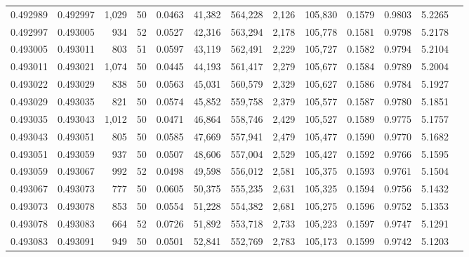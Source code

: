 \begin{tabular}{rrrrrrrrrrrrr}
0.492989 & 0.492997 & 1,029 &  50 &                                     0.0463 &  41,382 & 564,228 &   2,126 & 105,830 & 0.1579 & 0.9803 & 5.2265 \\
0.492997 & 0.493005 &   934 &  52 &                                     0.0527 &  42,316 & 563,294 &   2,178 & 105,778 & 0.1581 & 0.9798 & 5.2178 \\
0.493005 & 0.493011 &   803 &  51 &                                     0.0597 &  43,119 & 562,491 &   2,229 & 105,727 & 0.1582 & 0.9794 & 5.2104 \\
0.493011 & 0.493021 & 1,074 &  50 &                                     0.0445 &  44,193 & 561,417 &   2,279 & 105,677 & 0.1584 & 0.9789 & 5.2004 \\
0.493022 & 0.493029 &   838 &  50 &                                     0.0563 &  45,031 & 560,579 &   2,329 & 105,627 & 0.1586 & 0.9784 & 5.1927 \\
0.493029 & 0.493035 &   821 &  50 &                                     0.0574 &  45,852 & 559,758 &   2,379 & 105,577 & 0.1587 & 0.9780 & 5.1851 \\
0.493035 & 0.493043 & 1,012 &  50 &                                     0.0471 &  46,864 & 558,746 &   2,429 & 105,527 & 0.1589 & 0.9775 & 5.1757 \\
0.493043 & 0.493051 &   805 &  50 &                                     0.0585 &  47,669 & 557,941 &   2,479 & 105,477 & 0.1590 & 0.9770 & 5.1682 \\
0.493051 & 0.493059 &   937 &  50 &                                     0.0507 &  48,606 & 557,004 &   2,529 & 105,427 & 0.1592 & 0.9766 & 5.1595 \\
0.493059 & 0.493067 &   992 &  52 &                                     0.0498 &  49,598 & 556,012 &   2,581 & 105,375 & 0.1593 & 0.9761 & 5.1504 \\
0.493067 & 0.493073 &   777 &  50 &                                     0.0605 &  50,375 & 555,235 &   2,631 & 105,325 & 0.1594 & 0.9756 & 5.1432 \\
0.493073 & 0.493078 &   853 &  50 &                                     0.0554 &  51,228 & 554,382 &   2,681 & 105,275 & 0.1596 & 0.9752 & 5.1353 \\
0.493078 & 0.493083 &   664 &  52 &                                     0.0726 &  51,892 & 553,718 &   2,733 & 105,223 & 0.1597 & 0.9747 & 5.1291 \\
0.493083 & 0.493091 &   949 &  50 &                                     0.0501 &  52,841 & 552,769 &   2,783 & 105,173 & 0.1599 & 0.9742 & 5.1203 \\

\end{tabular}
